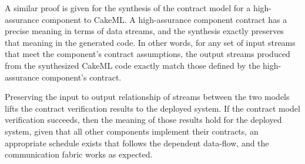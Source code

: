 A similar proof is given for the synthesis of the contract model for a high-assurance component to CakeML.
A high-assurance component contract has a precise meaning in terms of data streams, and the synthesis exactly preserves that meaning in the generated code.
In other words, for any set of input streams that meet the component's contract assumptions, the output streams produced from the synthesized CakeML code exactly match those defined by the high-assurance component's contract. 

Preserving the input to output relationship of streams between the two models lifts the contract verification results to the deployed system.
If the contract model verification succeeds, then the meaning of those results hold for the deployed system, given that all other components implement their contracts, an appropriate schedule exists that follows the dependent data-flow, and the communication fabric works as expected.
